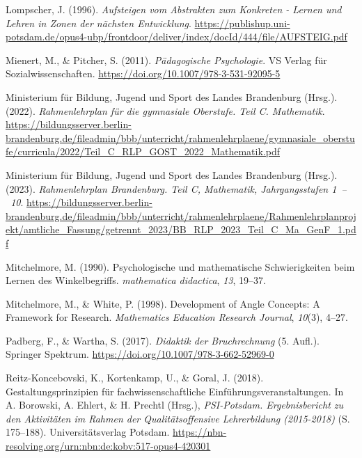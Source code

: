 \documentclass[
]{scrbook}
\newlength{\cslhangindent}
\newenvironment{CSLReferences}[2] %
 {\begin{list}{}{%
  \setlength{\itemindent}{0pt}
  \setlength{\leftmargin}{0pt}
  \setlength{\parsep}{0pt}
  \ifodd #1
   \setlength{\leftmargin}{\cslhangindent}
   \setlength{\itemindent}{-1\cslhangindent}
  \fi
  \setlength{\itemsep}{#2\baselineskip}}}
 {\end{list}}
\theoremstyle{definition}
\theoremstyle{definition}
\theoremstyle{definition}
\theoremstyle{definition}
\theoremstyle{remark}
\begin{document}
\begin{CSLReferences}{1}{0}
Lompscher, J. (1996). \emph{Aufsteigen vom {Abstrakten} zum {Konkreten} - {Lernen} und {Lehren} in {Zonen} der nächsten {Entwicklung}}. \url{https://publishup.uni-potsdam.de/opus4-ubp/frontdoor/deliver/index/docId/444/file/AUFSTEIG.pdf}

Mienert, M., \& Pitcher, S. (2011). \emph{Pädagogische {Psychologie}}. VS Verlag für Sozialwissenschaften. \url{https://doi.org/10.1007/978-3-531-92095-5}

Ministerium für Bildung, Jugend und Sport des Landes Brandenburg (Hrsg.). (2022). \emph{Rahmenlehrplan für die gymnasiale {Oberstufe}. {Teil} {C}. {Mathematik}}. \url{https://bildungsserver.berlin-brandenburg.de/fileadmin/bbb/unterricht/rahmenlehrplaene/gymnasiale_oberstufe/curricula/2022/Teil_C_RLP_GOST_2022_Mathematik.pdf}

Ministerium für Bildung, Jugend und Sport des Landes Brandenburg (Hrsg.). (2023). \emph{Rahmenlehrplan {Brandenburg}. {Teil} {C}, {Mathematik}, {Jahrgangsstufen} 1~--~10}. \url{https://bildungsserver.berlin-brandenburg.de/fileadmin/bbb/unterricht/rahmenlehrplaene/Rahmenlehrplanprojekt/amtliche_Fassung/getrennt_2023/BB_RLP_2023_Teil_C_Ma_GenF_1.pdf}

Mitchelmore, M. (1990). Psychologische und mathematische Schwierigkeiten beim Lernen des Winkelbegriffs. \emph{mathematica didactica}, \emph{13}, 19--37.

Mitchelmore, M., \& White, P. (1998). Development of {Angle} {Concepts}: {A} {Framework} for {Research}. \emph{Mathematics Education Research Journal}, \emph{10}(3), 4--27.

Padberg, F., \& Wartha, S. (2017). \emph{Didaktik der {Bruchrechnung}} (5. Aufl.). Springer Spektrum. \url{https://doi.org/10.1007/978-3-662-52969-0}

Reitz-Koncebovski, K., Kortenkamp, U., \& Goral, J. (2018). Gestaltungsprinzipien für fachwissenschaftliche {Einführungsveranstaltungen}. In A. Borowski, A. Ehlert, \& H. Prechtl (Hrsg.), \emph{{PSI}-{Potsdam}. {Ergebnisbericht} zu den {Aktivitäten} im {Rahmen} der {Qualitätsoffensive} {Lehrerbildung} (2015-2018)} (S. 175--188). Universitätsverlag Potsdam. \url{https://nbn-resolving.org/urn:nbn:de:kobv:517-opus4-420301}


\end{CSLReferences}
\end{document}
